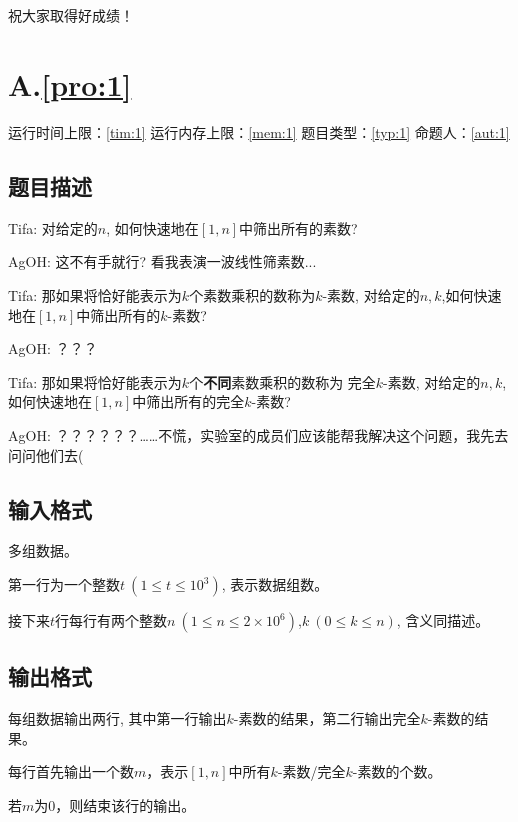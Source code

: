 \documentclass[
	lang=cn,
	color=green
]{elegantbook}
\begin{document}
\begin{titlepage}
	\paragraph*{} 祝大家取得好成绩！

\end{titlepage}

\chapter*{A.\quad \ref*{pro:1}}
\begin{center}
	运行时间上限：\ref*{tim:1} \quad 运行内存上限：\ref*{mem:1} \quad 题目类型：\ref*{typ:1} \quad 命题人：\ref*{aut:1}
\end{center}

\section*{题目描述}
Tifa: 对给定的$n$, 如何快速地在$[1,n]$中筛出所有的素数?

AgOH: 这不有手就行? 看我表演一波线性筛素数...

Tifa: 那如果将恰好能表示为$k$个素数乘积的数称为$k$-素数, 对给定的$n,k$,如何快速地在$[1,n]$中筛出所有的$k$-素数?

AgOH: ？？？

Tifa: 那如果将恰好能表示为$k$个\textbf{不同}素数乘积的数称为 完全$k$-素数, 对给定的$n,k$,如何快速地在$[1,n]$中筛出所有的完全$k$-素数?

AgOH: ？？？？？？……不慌，实验室的成员们应该能帮我解决这个问题，我先去问问他们去(

\section*{输入格式}
多组数据。

第一行为一个整数$t~(1\leq t\leq 10^3)$, 表示数据组数。

接下来$t$行每行有两个整数$n~(1\leq n\leq 2\times 10^6)$,$k~(0\leq k\leq n)$, 含义同描述。


\section*{输出格式}
每组数据输出两行, 其中第一行输出$k$-素数的结果，第二行输出完全$k$-素数的结果。

每行首先输出一个数$m$，表示$[1,n]$中所有$k$-素数/完全$k$-素数的个数。

若$m$为$0$，则结束该行的输出。
\end{document}
